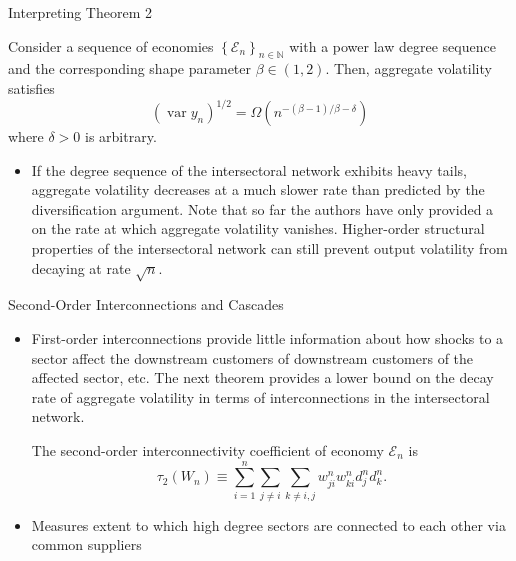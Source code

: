 \documentclass[dvipsnames]{beamer}
\begin{document}
\begin{frame}{Interpreting Theorem 2}
  \begin{corollary}[Corollary 1]
     Consider a sequence of economies $\left\{\mathcal{E}_{n}\right\}_{n \in \mathbb{N}}$ with a power law degree sequence and the corresponding shape parameter $\beta \in(1,2) .$ Then, aggregate volatility satisfies
$$
\left(\operatorname{var} y_{n}\right)^{1 / 2}=\Omega\left(n^{-(\beta-1) / \beta-\delta}\right)
$$
where $\delta>0$ is arbitrary.
  \end{corollary}
  \begin{itemize}
  \item If the degree sequence of the intersectoral network exhibits heavy tails, aggregate volatility decreases at a much slower rate than predicted by the diversification argument.
    \vitem Note that so far the authors have only provided a  on the rate at which aggregate volatility vanishes.
    \vitem Higher-order structural properties of the intersectoral network can still prevent output volatility from decaying at rate $\sqrt{n}$.
  \end{itemize}
\end{frame}
%
\begin{frame}{Second-Order Interconnections and Cascades}
  \begin{itemize}
  \item First-order interconnections provide little information about how shocks to a sector affect the downstream customers of downstream customers of the affected sector, etc.
    \vitem The next theorem provides a lower bound on the decay rate of aggregate volatility in terms of  interconnections in the intersectoral network.
    \begin{definition}
       The second-order interconnectivity coefficient of economy $\mathcal{E}_{n}$ is
$$
\tau_{2}\left(W_{n}\right) \equiv \sum_{i=1}^{n} \sum_{j \neq i} \sum_{k \neq i, j} w_{j i}^{n} w_{k i}^{n} d_{j}^{n} d_{k}^{n}.
$$
    \end{definition}
    \item Measures extent to which high degree sectors are connected to each other via common suppliers
  \end{itemize}
\end{frame}
%
\end{document}
